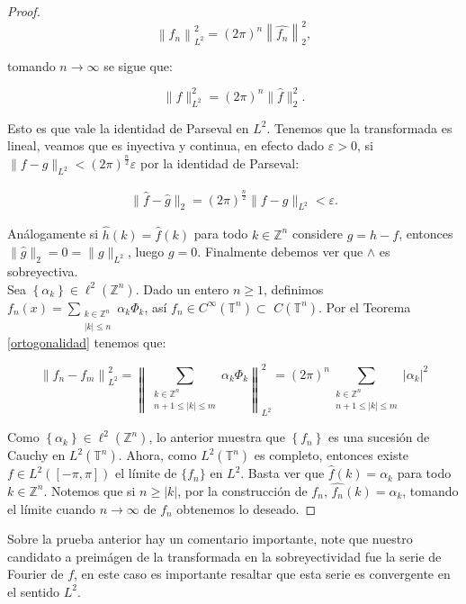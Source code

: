 \documentclass[12pt]{article}
\newcommand\Z{\ensuremath{\mathbb{Z}}}
\newcommand\T{\mathbb{T}}
\renewcommand{\epsilon}{\varepsilon}
\renewcommand{\hat}{\widehat}
\begin{document}
\begin{proof}
$$\left\|f_n\right\|_{L^2}^2=(2 \pi)^n\left\|\widehat{f_n}\right\|_2^2,$$

tomando $n\to \infty$ se sigue que:

$$\|f\|_{L^2}^2=(2\pi)^n\|\widehat{f}\|_2^2.$$

Esto es que vale la identidad de Parseval en $L^2$. Tenemos que la transformada es lineal, veamos que es inyectiva y continua, en efecto dado $\epsilon>0$, si $\|f-g\|_{L^2}<(2\pi)^{\frac{n}{2}}\epsilon$  por la identidad de Parseval:

\begin{align*}
    \|\widehat{f}-\widehat{g}\|_2=(2\pi)^{\frac{n}{2}}\|f-g\|_{L^2}<\epsilon
.\end{align*}

Análogamente si $\hat{h}(k)=\hat{f}(k)$ para todo $k\in \Z^n$ considere $g=h-f$, entonces $\|\widehat{g}\|_{2}=0=\|g\|_{L^2}$, luego $g=0$. Finalmente debemos ver que $\wedge$ es sobreyectiva.\\

Sea $\left\{\alpha_k\right\} \in \ell^2(\mathbb{Z}^n)$. Dado un entero $n \geq 1$, definimos $f_n(x)=\displaystyle\sum_{\substack{k\in \Z^n\\
|k|\leq n}} \alpha_k \Phi_k$, así $f_n \in C^{\infty}(\T^n) \subset$ $C(\T^n)$. 
Por el Teorema \ref{ortogonalidad} tenemos que:

$$
\left\|f_n-f_m\right\|_{L^2}^2=\left\|\sum_{\substack{k\in \Z^n\\
n+1 \leq|k| \leq m}} \alpha_k \Phi_k\right\|_{L^2}^2=(2 \pi)^n\sum_{\substack{k\in \Z^n\\ n+1 \leq|k| \leq m}}\left|\alpha_k\right|^2
$$


Como $\left\{\alpha_k\right\} \in \ell^2(\mathbb{Z}^n)$, lo anterior muestra que $\left\{f_n\right\}$ es una sucesión de Cauchy en $L^2(\T^n)$. Ahora, como $L^2(\T^n)$ es completo, entonces existe $f \in L^2([-\pi, \pi])$ el límite de $\{f_n\}$ en $L^2$. Basta ver que $\widehat{f}(k)=\alpha_k$ para todo $k \in \mathbb{Z}^n$. Notemos que si $n \geq|k|$, por la construcción de $f_n$, $\widehat{f_n}(k)=\alpha_k$, tomando el límite cuando $n\to \infty$ de $f_n$ obtenemos lo deseado.
\end{proof}

\begin{note}
Sobre la prueba anterior hay un comentario importante, note que nuestro candidato a preimágen de la transformada en la sobreyectividad fue la serie de Fourier de $f$, en este caso es importante resaltar que esta serie es convergente  en el sentido $L^2$.
\end{note}
\end{document}

